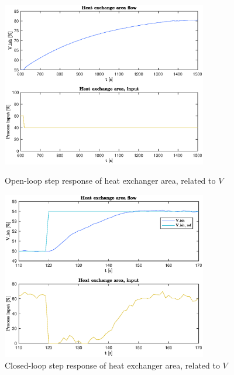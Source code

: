 \documentclass[12pt]{article}
\begin{document}
\begin{figure}[p]
\centering
\includegraphics[width=0.8\textwidth]{../Systemanalyse/Log_Data_to_Matlab/Figurer/Stegeksperimenter/LC1028.eps}
\caption{Open-loop step response of heat exchanger area, related to $V$}
\label{fig:ol_step_LC1028}

\includegraphics[width=0.8\textwidth]{../Systemanalyse/Log_Data_to_Matlab/Figurer/Stegeksperimenter/LC1028_step.eps}
\caption{Closed-loop step response of heat exchanger area, related to $V$}
\label{fig:cl_step_LC1028}
\end{figure}
\end{document}
